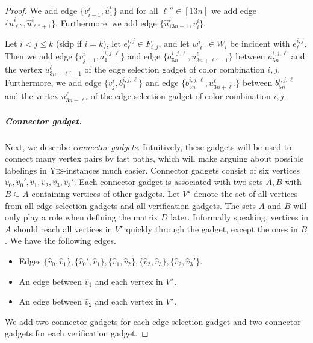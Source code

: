 \documentclass[a4paper,UKenglish,cleveref, autoref, thm-restate, anonymous]{lipics-v2021}
\begin{document}
\begin{proof}
    We add edge $\{v^i_{i-1},\hat{u}^i_1\}$ and for all $\ell''\in[13n]$ we add edge $\{\hat{u}^i_{\ell''},\hat{u}^i_{\ell''+1}\}$. Furthermore, we add edge $\{\hat{u}^i_{13n+1},v^i_i\}$. 

    Let $i<j\le k$ (skip if $i=k$), let $e_\ell^{i,j}\in F_{i,j}$, and let $w^i_{\ell'}\in W_i$ be incident with $e_\ell^{i,j}$. Then we add edge $\{v_{j-1}^i,a^{i,j,\ell}_{1}\}$ and edge $\{a^{i,j,\ell}_{5n},u^\ell_{3n+\ell'-1}\}$ between $a^{i,j,\ell}_{5n}$ and the vertex $u^\ell_{3n+\ell'-1}$ of the edge selection gadget of color combination $i,j$.
    Furthermore, we add edge $\{v_{j}^i,b^{i,j,\ell}_{1}\}$ and edge $\{b^{i,j,\ell}_{5n},u^\ell_{3n+\ell'}\}$ between $b^{i,j,\ell}_{5n}$ and the vertex $u^\ell_{3n+\ell'}$ of the edge selection gadget of color combination $i,j$.


    \subparagraph{Connector gadget.} Next, we describe \emph{connector gadgets}. Intuitively, these gadgets will be used to connect many vertex pairs by fast paths, which will make arguing about possible labelings in \textsc{Yes}-instances much easier. Connector gadgets consist of six vertices $\hat{v}_0,\hat{v}_0',\hat{v}_1,\hat{v}_2,\hat{v}_3,\hat{v}_3'$. 
    Each connector gadget is associated with two sets $A,B$ with $B\subseteq A$ containing vertices of other gadgets. 
    Let $V^\star$ denote the set of all vertices from all edge selection gadgets and all verification gadgets.
    The sets $A$ and $B$ will only play a role when defining the matrix $D$ later. Informally speaking, vertices in $A$ should reach all vertices in $V^\star$ quickly through the gadget, except the ones in $B$.
    We have the following edges. 
    \begin{itemize}
        \item Edges $\{\hat{v}_0,\hat{v}_1\},\{\hat{v}_0',\hat{v}_1\},\{\hat{v}_1,\hat{v}_2\},\{\hat{v}_2,\hat{v}_3\},\{\hat{v}_2,\hat{v}_3'\}$.
        \item An edge between $\hat{v}_1$ and each vertex in $V^\star$.
        \item An edge between $\hat{v}_2$ and each vertex in $V^\star$.
    \end{itemize}
    We add two connector gadgets for each edge selection gadget and two connector gadgets for each verification gadget.
    

\end{proof}
\end{document}
